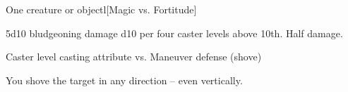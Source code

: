 \begin{spellheader}
    \spellrng{\rngmed}
\end{spellheader}
\begin{spelleffects}
    \begin{spelltarget}{One creature or object}l[Magic vs. Fortitude]
        \begin{spellmargin}
            \spellsuccess 5d10 bludgeoning damage \add d10 per four caster levels above 10th.
            \spellfailure Half damage.
        \end{spellmargin}
        \spellatk Caster level \add casting attribute  vs. Maneuver defense (shove)
        \begin{spellmargin}
            \spellsuccess You shove the target in any direction -- even vertically.
        \end{spellmargin}
    \end{spelltarget}
\end{spelleffects}


